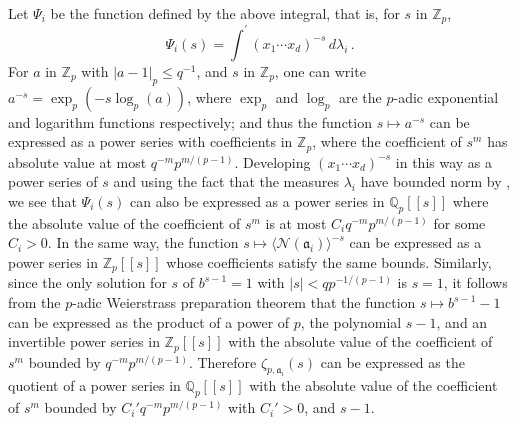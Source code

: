 \documentclass{amsart}
\begin{document}
Let $\Psi_i$ be the function defined by the above integral, that is, for $ s $ in $ {\mathbb Z_p} $,
$$
\Psi_i(s) = {\int^{\prime}} (x_1 \cdots x_d)^{-s} \, d\lambda_i\,.
$$
For $a$ in $ {\mathbb Z_p}$ with $|a - 1|_p \leq q^{-1}$, and $ s $ in $ {\mathbb Z_p} $, one can write $a^{-s} =
\exp_p(-s \log_p(a))$, where $\exp_p$ and $\log_p$ are the
{$p$-adic{\futurelet{}}} exponential and logarithm functions respectively; and thus the function $s
\mapsto a^{-s}$ can be expressed as a power series with coefficients
in ${\mathbb Z_p}$, where the coefficient
of $s^m$ has absolute value at most $ q^{-m}p^{m/(p-1)}$. Developing $
(x_1\cdots x_d)^{-s} $ in this way as a power series of $s$ and using
the fact that the measures $\lambda_i$ have bounded norm 
by \cite[Lemme 4.2 bis]{Colm88},  we see that
$\Psi_i(s)$ can also be expressed as a power series in
${{\mathbb Q_p}}[[s]]$ where the absolute value of the coefficient of
$s^m$ is at most $ C_i q^{-m}p^{m/(p-1)}$ for some $ C_i>0 $.
In the same way, the
function $s \mapsto \langle \mathcal{N}(\mathfrak{a}_i) \rangle^{-s}$
can be expressed as a power series in ${\mathbb Z_p}[[s]]$ whose
coefficients satisfy the same bounds.  
Similarly, since the only solution for $ s $ of $b^{s-1} = 1$ with $ |s| < q p^{-1/(p-1)} $
is $s = 1$, it follows from the {$p$-adic{\futurelet{}}} Weierstrass
preparation theorem that the function $s \mapsto b^{s-1}-1$ can be
expressed as the product of a power of $ p $, the polynomial $s-1$, and an invertible
power series in ${\mathbb Z_p}[[s]]$ with the absolute value of the coefficient of $ s^m $ bounded by 
$ q^{-m} p^{m/(p-1)} $.
Therefore $\zeta_{p,\mathfrak{a}_i}(s)$ can be expressed as the quotient of a
power series in ${{\mathbb Q_p}}[[s]]$ with the absolute value of the coefficient of $ s^m $ 
bounded by $ C_i' q^{-m} p^{m/(p-1)} $ with $ C_i'>0 $, and $s-1$.
\end{document}
